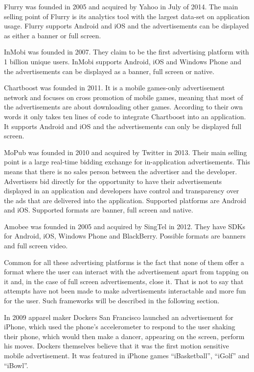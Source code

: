 Flurry was founded in 2005 and acquired by Yahoo in July of 2014. \cite{crunchbase-flurry} The main selling point of Flurry is its analytics tool with the largest data-set on application usage. \cite{maps-yankeegroup} Flurry supports Android and iOS and the advertisements can be displayed as either a banner or full screen.

InMobi was founded in 2007. \cite{crunchbase-inmobi} They claim to be the first advertising platform with 1 billion unique users. \cite{inmobi} InMobi supports Android, iOS and Windows Phone \cite{inmobi-monetize} and the advertisements can be displayed as a banner, full screen or native. \cite{inmobi-sdk}

Chartboost was founded in 2011. \cite{crunchbase-chartboost} It is a mobile games-only advertisement network and focuses on cross promotion of mobile games, meaning that most of the advertisements are about downloading other games. According to their own words it only takes ten lines of code to integrate Chartboost into an application. \cite{chartboost} It supports Android and iOS and the advertisements can only be displayed full screen.\cite{hongikiat-monetize}

MoPub was founded in 2010 and acquired by Twitter in 2013. \cite{crunchbase-mopub} Their main selling point is a large real-time bidding exchange for in-application advertisements. This means that there is no sales person between the advertiser and the developer. Advertisers bid directly for the opportunity to have their advertisements displayed in an application and developers have  control and transparency over the ads that are delivered into the application. \cite{mopub-marketplace} Supported platforms are Android and iOS. \cite{mopub-resources} Supported formats are banner, full screen and native.

Amobee was founded in 2005 and acquired by SingTel in 2012. \cite{crunchbase-amobee} They have SDKs for Android, iOS, Windows Phone and BlackBerry. Possible formats are banners and full screen video.

Common for all these advertising platforms is the fact that none of them offer a format where the user can interact with the advertisement apart from tapping on it and, in the case of full screen advertisements, close it. That is not to say that attempts have not been made to make advertisements interactable and more fun for the user. Such frameworks will be described in the following section.

In 2009 apparel maker Dockers San Francisco launched an advertisement for iPhone, which used the phone's accelerometer to respond to the user shaking their phone, which would then make a dancer, appearing on the screen, perform his moves. Dockers themselves believe that it was the first motion sensitive mobile advertisement. It was featured in iPhone games “iBasketball”, “iGolf” and “iBowl”.\cite{dockers}

